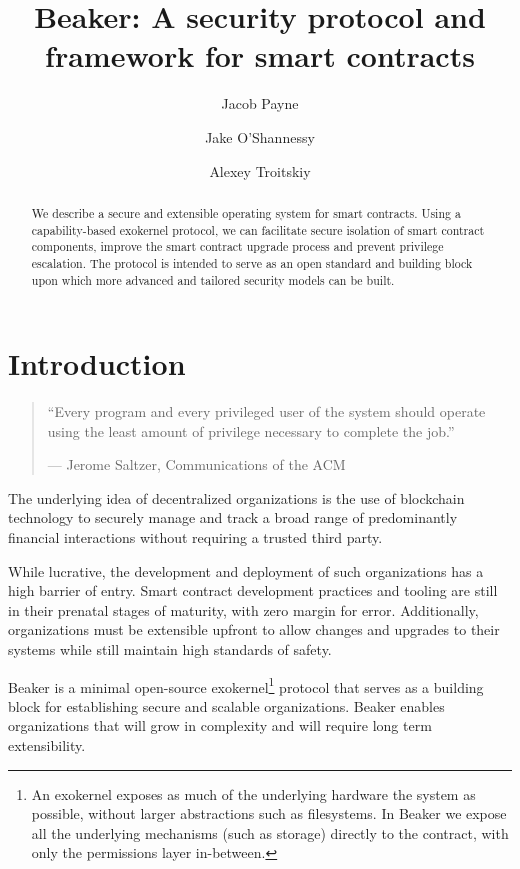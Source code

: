 \documentclass[english,a4paper]{article}
\title{Beaker: A security protocol and framework for smart
contracts}\label{beaker-a-security-protocol-and-framework-for-smart-contracts}
\author{Jacob Payne \and Jake O'Shannessy \and Alexey Troitskiy}
\begin{document}
\maketitle

\begin{abstract}\label{abstract}

We describe a secure and extensible operating system for smart contracts. Using
a capability-based exokernel protocol, we can facilitate secure isolation of
smart contract components, improve the smart contract upgrade process and
prevent privilege escalation. The protocol is intended to serve as an open
standard and building block upon which more advanced and tailored security
models can be built.

\end{abstract}

\newpage
\tableofcontents
\newpage

\section{Introduction}\label{introduction}
\begin{quote}
``Every program and every privileged user of the system should operate
using the least amount of privilege necessary to complete the job.''

--- Jerome Saltzer, Communications of the ACM
\end{quote}

The underlying idea of decentralized organizations is the use of
blockchain technology to securely manage and track a broad range of
predominantly financial interactions without requiring a trusted third
party.

While lucrative, the development and deployment of such organizations
has a high barrier of entry. Smart contract development practices and
tooling are still in their prenatal stages of maturity, with zero margin
for error. Additionally, organizations must be extensible upfront to
allow changes and upgrades to their systems while still maintain high
standards of safety.

Beaker is a minimal open-source exokernel\footnote{An exokernel exposes as much
of the underlying hardware the system as possible, without larger abstractions
such as filesystems. In Beaker we expose all the underlying mechanisms (such as
storage) directly to the contract, with only the permissions layer in-between.}
protocol that serves as a building block for establishing secure and scalable
organizations. Beaker enables organizations that will grow in complexity and
will require long term extensibility.
\end{document}
